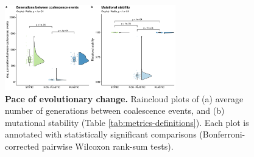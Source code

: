 
\begin{figure}[h!]
    \centering
    \includegraphics[width=0.66\textwidth]{media/evolutionary-change-pace-panel.pdf}
    \caption{\small
    \textbf{Pace of evolutionary change.}
    Raincloud plots of 
    (a) average number of generations between coalescence events,
    and (b) mutational stability (Table \ref{tab:metrics-definitions}).
    Each plot is annotated with statistically significant comparisons (Bonferroni-corrected pairwise Wilcoxon rank-sum tests).
    }
    \label{fig:evolutionary-dynamics-rate}
\end{figure}
